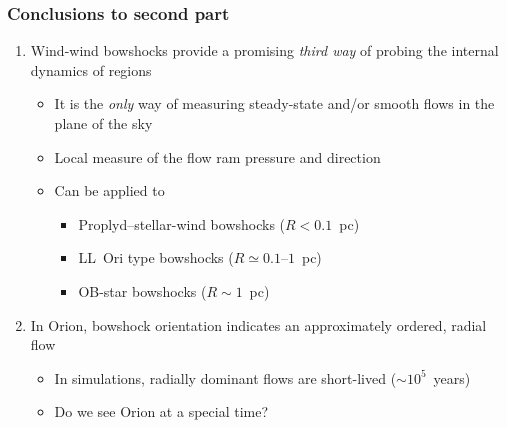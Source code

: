 \documentclass[presentation]{beamer}
\begin{document}
\begin{frame}
  \frametitle{Conclusions to second part}
  \begin{enumerate}
  \item Wind-wind bowshocks provide a promising \emph{third way} of
    probing the internal dynamics of \hii{} regions
    \begin{itemize}
    \item It is the \emph{only} way of measuring steady-state and/or
      smooth flows in the plane of the sky
    \item Local measure of the flow ram pressure and direction
    \item Can be applied to
      \begin{itemize}
      \item Proplyd--stellar-wind bowshocks (\(R < 0.1\)~pc)
      \item LL~Ori type bowshocks (\(R \simeq 0.1\)--\(1\)~pc)
      \item OB-star bowshocks (\(R \sim 1\)~pc)
      \end{itemize}

    \end{itemize}
  \item In Orion, bowshock orientation indicates an approximately
    ordered, radial flow
    \begin{itemize}
    \item In simulations, radially dominant flows are
      short-lived (\(\sim 10^5\)~years)
    \item Do we see Orion at a special time?
    \end{itemize}

  \end{enumerate}
\end{frame}
\end{document}
